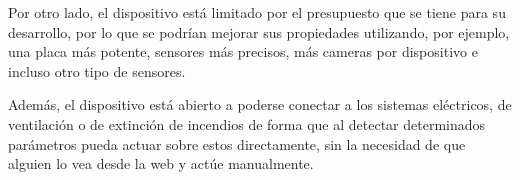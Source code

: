 Por otro lado, el dispositivo está limitado por el presupuesto que se tiene para su desarrollo, por lo que se podrían mejorar sus propiedades utilizando, por ejemplo, una placa más potente, sensores más precisos, más cameras por dispositivo e incluso otro tipo de sensores.

Además, el dispositivo está abierto a poderse conectar a los sistemas eléctricos, de ventilación o de extinción de incendios de forma que al detectar determinados parámetros pueda actuar sobre estos directamente, sin la necesidad de que alguien lo vea desde la web y actúe manualmente.